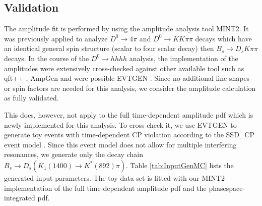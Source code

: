 %

\clearpage
\subsection{Validation}

The amplitude fit is performed by using the amplitude analysis tool \textsf{MINT2}.
It was previously applied to analyze $D^0 \to 4 \pi$ and $D^0 \to KK\pi\pi$ decays \cite{dArgent:2017gzv}
which have an identical general spin structure (\ie scalar to four scalar decay) then $B_s \to D_s K \pi\pi$ decays. 
In the course of the $D^0 \to hhhh$ analysis, the implementation of the amplitudes were extensively cross-checked against 
other available tool such as \textsf{qft++} \cite{Williams:2008wu}, \textsf{AmpGen} \cite{Aaij:2017kbo} and were possible \textsf{EVTGEN} \cite{Lange:2001uf}.
Since no additional line shapes or spin factors are needed for this analysis, we consider the amplitude calculation as fully validated.

This does, however, not apply to the full time-dependent amplitude pdf which is newly implemented for this analysis.
To cross-check it, we use \textsf{EVTGEN} to generate toy events with time-dependent CP violation according to the \textsf{SSD\_CP} event model \cite{Lange:2001uf}.
Since this event model does not allow for multiple interfering resonances, we generate only the decay chain 
$B_s \to D_s \left( K_1(1400) \to K^{*}(892) \pi \right)$. Table \ref{tab:InputGenMC}  lists the generated input parameters.
The toy data set is fitted with our \textsf{MINT2} implementation of the full time-dependent amplitude pdf and the phasespace-integrated pdf.

